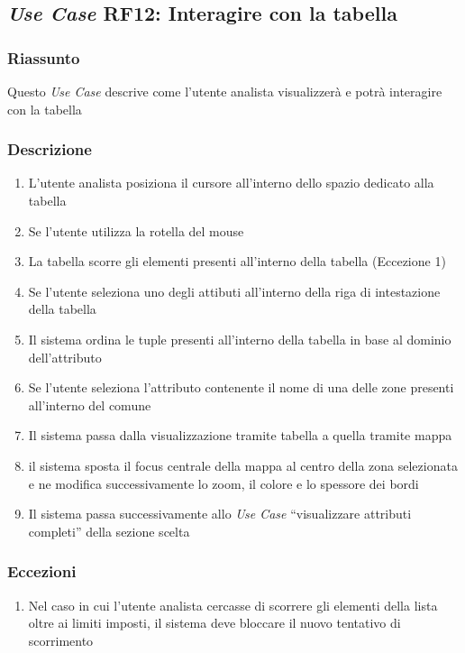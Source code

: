     \subsection{\textit{Use Case} RF12: Interagire con la tabella}
        \subsubsection{Riassunto}
            Questo \textit{Use Case} descrive come l'utente analista visualizzerà e potrà interagire con la tabella
        \subsubsection{Descrizione}
            \begin{enumerate}
                \item L'utente analista posiziona il cursore all'interno dello spazio dedicato alla tabella
                \item Se l'utente utilizza la rotella del mouse
                \item La tabella scorre gli elementi presenti all'interno della tabella (Eccezione 1)
                \item Se l'utente seleziona uno degli attibuti all'interno della riga di intestazione della tabella
                \item Il sistema ordina le tuple presenti all'interno della tabella in base al dominio dell'attributo
                \item Se l'utente seleziona l'attributo contenente il nome di una delle zone presenti all'interno del comune
                \item Il sistema passa dalla visualizzazione tramite tabella a quella tramite mappa
                \item il sistema sposta il focus centrale della mappa al centro della zona selezionata e ne modifica successivamente lo zoom, il colore e lo spessore dei bordi
                \item Il sistema passa successivamente allo \textit{Use Case} ``visualizzare attributi completi'' della sezione scelta
            \end{enumerate}
        \subsubsection{Eccezioni}
            \begin{enumerate}
                \item Nel caso in cui l'utente analista cercasse di scorrere gli elementi della lista oltre ai limiti imposti, il sistema deve bloccare il nuovo tentativo di scorrimento
            \end{enumerate}
